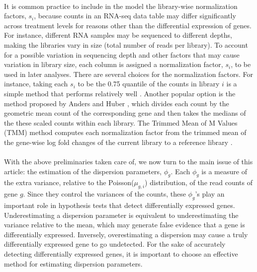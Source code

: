 \documentclass[10pt]{article}
\begin{document}
\paragraph{} \indent It is common practice to include in the model the library-wise normalization factors, $s_i$, because counts in an RNA-seq data table may differ significantly across treatment levels for reasons other than the differential expression of genes. For instance, different RNA samples may be sequenced to different depths, making the libraries vary in size (total number of reads per library). To account for a possible variation in sequencing depth and other factors that may cause variation in library size, each column is assigned a normalization factor, $s_i$, to be used in later analyses. There are several choices for the normalization factors. For instance, taking each $s_i$ to be the 0.75 quantile of the counts in library $i$ is a simple method that performs relatively well \cite{amap}. Another popular option is the method proposed by Anders and Huber \cite{deseq}, which divides each count by the geometric mean count of the corresponding gene and then takes the medians of the these scaled counts within each library. The Trimmed Mean of M Values (TMM) method computes each normalization factor from the trimmed mean of the gene-wise log fold changes of the current library to a reference library \cite{tmm}.




\paragraph{} \indent With the above preliminaries taken care of, we now turn to the main issue of this article: the estimation of the dispersion parameters, $\phi_{g}$. Each $\phi_{g}$ is a measure of the extra variance, relative to the Poisson($\mu_{g,i}$) distribution, of the read counts of gene $g$. Since they control the variances of the counts, these $\phi_g$'s play an important role in hypothesis tests that detect differentially expressed genes. Underestimating a dispersion parameter is equivalent to underestimating the variance relative to the mean, which may generate false evidence that a gene is differentially expressed. Inversely, overestimating a dispersion may cause a truly differentially expressed gene to go undetected. For the sake of accurately detecting differentially expressed genes, it is important to choose an effective method for estimating dispersion parameters.
\end{document}

